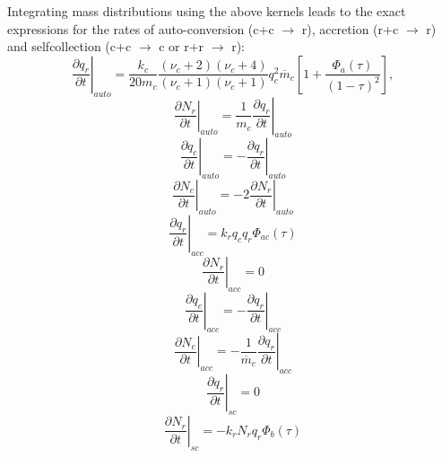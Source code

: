 \documentclass[12pt,A4,french]{article}
\begin{document}
\begin{description}
Integrating mass distributions using the above kernels leads to the exact expressions for the rates of 
auto-conversion (c+c $\rightarrow$ r), accretion (r+c $\rightarrow$ r) and selfcollection (c+c $\rightarrow$ c or r+r $\rightarrow$ r):
\begin{equation}
\left.\frac{\partial q_{r}}{\partial t}\right|_{auto} = \frac{k_{c}}{20 m_{c}} \frac{\left(\nu_{c}+2\right)\left(\nu_{c}+4\right)}{\left(\nu_{c}+1\right)
\left(\nu_{c}+1\right)} q_{c}^{2} \overline{m}_{c} \left[1+\frac{\Phi_{a}\left(\tau\right)}{\left(1-\tau\right)^{2}}\right],
\label{auq}
\end{equation}
\begin{equation}
\left.\frac{\partial N_{r}}{\partial t}\right|_{auto} = \frac{1}{m_{c}} \left.\frac{\partial q_{r}}{\partial t}\right|_{auto}
\label{aun}
\end{equation}
\begin{equation}
\left.\frac{\partial q_{c}}{\partial t}\right|_{auto} = -\left.\frac{\partial q_{r}}{\partial t}\right|_{auto} 
\label{ccq}
\end{equation}
\begin{equation}
\left.\frac{\partial N_{c}}{\partial t}\right|_{auto} = -2 \left.\frac{\partial N_{r}}{\partial t}\right|_{auto}
\label{ccn}
\end{equation}
\begin{equation}
\left.\frac{\partial q_{r}}{\partial t}\right|_{acc} = k_{r} q_{c} q_{r} \Phi_{ac}\left(\tau\right)
\label{crrq}
\end{equation}
\begin{equation}
\left.\frac{\partial N_{r}}{\partial t}\right|_{acc} = 0
\label{crrn}
\end{equation}
\begin{equation}
\left.\frac{\partial q_{c}}{\partial t}\right|_{acc} = -\left.\frac{\partial q_{r}}{\partial t}\right|_{acc}
\label{crcq}
\end{equation}
\begin{equation}
\left.\frac{\partial N_{c}}{\partial t}\right|_{acc} = -\frac{1}{\overline{m}_{c}} \left.\frac{\partial q_{r}}{\partial t}\right|_{acc}
\label{crcn}
\end{equation}
\begin{equation}
\left.\frac{\partial q_{r}}{\partial t}\right|_{sc} = 0
\label{scrq}
\end{equation}
\begin{equation}
\left.\frac{\partial N_{r}}{\partial t}\right|_{sc} = -k_{r} N_{r} q_{r} \Phi_{b}\left(\tau\right) 

\end{equation}
\end{description}
\end{document}
